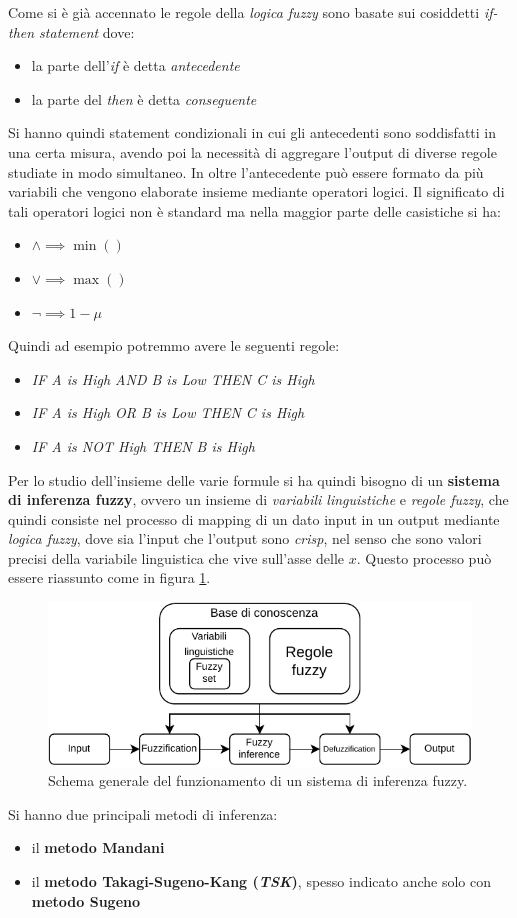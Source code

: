 \documentclass[a4paper,12pt, oneside]{book}
\begin{document}
Come si è già accennato le regole della \textit{logica fuzzy} sono basate sui
cosiddetti \textit{if-then statement} dove:
\begin{itemize}
  \item la parte dell'\textit{if} è detta \textit{antecedente}
  \item la parte del \textit{then} è detta \textit{conseguente}
\end{itemize}
Si hanno quindi statement condizionali in cui gli antecedenti sono soddisfatti
in una certa misura, avendo poi la necessità di aggregare l'output di diverse
regole studiate in modo simultaneo. In oltre l'antecedente può essere formato da
più variabili che vengono elaborate insieme mediante operatori logici. Il
significato di tali operatori logici non è standard ma nella maggior parte delle
casistiche si ha:
\begin{itemize}
  \item $\land \implies \min()$
  \item $\lor  \implies \max()$
  \item $\neg \implies 1-\mu$
\end{itemize}
Quindi ad esempio potremmo avere le seguenti regole:
\begin{itemize}
  \item \textit{IF A is High AND B is Low THEN C is High}
  \item \textit{IF A is High OR B is Low THEN C is High}
  \item \textit{IF A is NOT High THEN B is High}
\end{itemize}
Per lo studio dell'insieme delle varie formule si ha quindi bisogno di un
\textbf{sistema di inferenza fuzzy}, ovvero un insieme di \textit{variabili
  linguistiche} e \textit{regole fuzzy}, che quindi consiste nel processo di
mapping di un dato input in un output mediante \textit{logica fuzzy}, dove sia
l'input che l'output sono \textit{crisp}, nel senso che sono valori precisi
della variabile linguistica che vive sull'asse delle $x$. Questo processo può
essere riassunto come in figura \ref{fig:fproc}.
\begin{figure}
  \centering
  \includegraphics[scale = 1]{img/fproc.pdf}
  \caption{Schema generale del funzionamento di un sistema di inferenza fuzzy.}
  \label{fig:fproc}
\end{figure}
Si hanno due principali metodi di inferenza:
\begin{itemize}
  \item il \textbf{metodo Mandani}
  \item il \textbf{metodo Takagi-Sugeno-Kang (\textit{TSK})}, spesso indicato
  anche solo con \textbf{metodo Sugeno}
\end{itemize}
\end{document}

